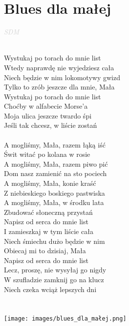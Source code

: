 \documentclass[a5paper, 10pt]{book}
\begin{document}
\newpage
\section{Blues dla małej}\textcolor{lightgray}{\textit{SDM}}\\~\\
\begin{minipage}[t]{0.8\textwidth}
  Wystukaj po torach do mnie list\\
  Wtedy naprawdę nie wyjedziesz cała\\
  Niech będzie w nim lokomotywy gwizd\\
  Tylko to zrób jeszcze dla mnie, Mała\\
  Wystukaj po torach do mnie list\\
  Choćby w alfabecie Morse'a\\
  Moja ulica jeszcze twardo śpi\\
  Jeśli tak chcesz, w liście zostań\\
  \\
  \hspace*{4mm} A mogliśmy, Mała, razem łąką iść\\
  \hspace*{4mm} Świt witać po kolana w rosie\\
  \hspace*{4mm} A mogliśmy, Mała, razem piwo pić\\
  \hspace*{4mm} Dom nasz zamienić na sto pociech\\
  \hspace*{4mm} A mogliśmy, Mała, konie kraść\\
  \hspace*{4mm} Z niebieskiego boskiego pastwiska\\
  \hspace*{4mm} A mogliśmy, Mała, w środku lata\\
  \hspace*{4mm} Zbudować słoneczną przystań\\

  Napisz od serca do mnie list\\
  I zamieszkaj w tym liście cała\\
  Niech śmiechu dużo będzie w nim\\
  Obiecaj mi to dzisiaj, Mała\\
  Napisz od serca do mnie list\\
  Lecz, proszę, nie wysyłaj go nigdy\\
  W szufladzie zamknij go na klucz\\
  Niech czeka wciąż lepszych dni\\
  \\
  \\
  \texttt{[image: images/blues\_dla\_małej.png]}\\
\end{minipage}
\end{document}
